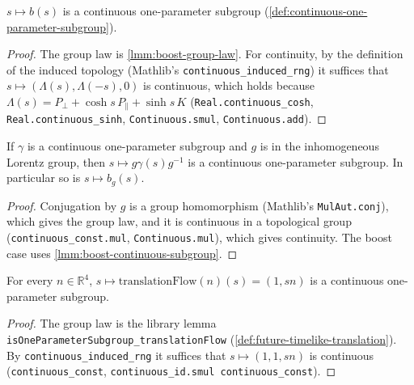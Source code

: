 \begin{lemma}
    \label{lmm:boost-continuous-subgroup}
    \leanok
    $s \mapsto b(s)$ is a continuous one-parameter subgroup (\ref{def:continuous-one-parameter-subgroup}).
\end{lemma}
\begin{proof}
    \leanok
    The group law is \ref{lmm:boost-group-law}. For continuity, by the definition of the induced topology (Mathlib's \texttt{continuous\_induced\_rng}) it suffices that $s \mapsto (\Lambda(s), \Lambda(-s), 0)$ is continuous, which holds because $\Lambda(s) = P_\perp + \cosh s\,P_\parallel + \sinh s\,K$ (\texttt{Real.continuous\_cosh}, \texttt{Real.continuous\_sinh}, \texttt{Continuous.smul}, \texttt{Continuous.add}).
\end{proof}

\begin{lemma}
    \label{lmm:conjugate-continuous-subgroup}
    \leanok
    If $\gamma$ is a continuous one-parameter subgroup and $g$ is in the inhomogeneous Lorentz group, then $s \mapsto g\gamma(s)g^{-1}$ is a continuous one-parameter subgroup. In particular so is $s \mapsto b_g(s)$.
\end{lemma}
\begin{proof}
    \leanok
    Conjugation by $g$ is a group homomorphism (Mathlib's \texttt{MulAut.conj}), which gives the group law, and it is continuous in a topological group (\texttt{continuous\_const.mul}, \texttt{Continuous.mul}), which gives continuity. The boost case uses \ref{lmm:boost-continuous-subgroup}.
\end{proof}

\begin{lemma}
    \label{lmm:translation-flow-continuous-subgroup}
    \leanok
    For every $n \in \mathbb{R}^4$, $s \mapsto \mathrm{translationFlow}(n)(s) = (1, sn)$ is a continuous one-parameter subgroup.
\end{lemma}
\begin{proof}
    \leanok
    The group law is the library lemma \texttt{isOneParameterSubgroup\_translationFlow} (\ref{def:future-timelike-translation}). By \texttt{continuous\_induced\_rng} it suffices that $s \mapsto (1, 1, sn)$ is continuous (\texttt{continuous\_const}, \texttt{continuous\_id.smul continuous\_const}).
\end{proof}

